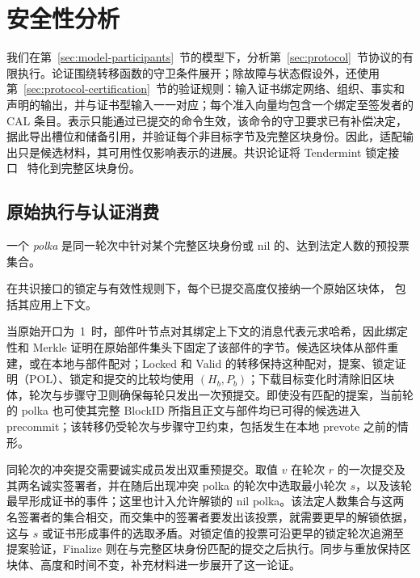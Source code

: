 \section{安全性分析}
\label{sec:security}

我们在第~\ref{sec:model-participants}~节的模型下，分析第~\ref{sec:protocol}~节协议的有限执行。论证围绕转移函数的守卫条件展开；除故障与状态假设外，还使用第~\ref{sec:protocol-certification}~节的验证规则：输入证书绑定网络、组织、事实和声明的输出，并与证书型输入一一对应；每个准入向量均包含一个绑定至签发者的 CAL 条目。表示只能通过已提交的命令生效，该命令的守卫要求已有补偿决定，据此导出槽位和储备引用，并验证每个非目标字节及完整区块身份。因此，适配输出只是候选材料，其可用性仅影响表示的进展。共识论证将 Tendermint 锁定接口~\cite{tendermint} 特化到完整区块身份。

\subsection{原始执行与认证消费}
\label{sec:security-identity}

一个 \emph{polka} 是同一轮次中针对某个完整区块身份或 nil 的、达到法定人数的预投票集合。

\begin{lemma}[原始执行的一致性]
\label{lem:security-original}
在共识接口的锁定与有效性规则下，每个已提交高度仅接纳一个原始区块体，
包括其应用上下文。
\end{lemma}
\begin{IEEEproof}
当原始开口为~1~时，部件叶节点对其绑定上下文的消息代表元求哈希，因此绑定性和 Merkle 证明在原始部件集头下固定了该部件的字节。候选区块体从部件重建，或在本地与部件配对；Locked 和 Valid 的转移保持这种配对，提案、锁定证明（POL）、锁定和提交的比较均使用 $(H_b,P_b)$；下载目标变化时清除旧区块体，轮次与步骤守卫则确保每轮只发出一次预提交。即使没有匹配的提案，当前轮的 polka 也可使其完整 BlockID 所指且正文与部件均已可得的候选进入 precommit；该转移仍受轮次与步骤守卫约束，包括发生在本地 prevote 之前的情形。

同轮次的冲突提交需要诚实成员发出双重预提交。取值 $v$ 在轮次 $r$ 的一次提交及其两名诚实签署者，并在随后出现冲突 polka 的轮次中选取最小轮次 $s$，以及该轮最早形成证书的事件；这里也计入允许解锁的 nil polka。该法定人数集合与这两名签署者的集合相交，而交集中的签署者要发出该投票，就需要更早的解锁依据，这与 $s$ 或证书形成事件的选取矛盾。对锁定值的投票可沿更早的锁定轮次追溯至提案验证，Finalize 则在与完整区块身份匹配的提交之后执行。同步与重放保持区块体、高度和时间不变，补充材料进一步展开了这一论证。
\end{IEEEproof}

